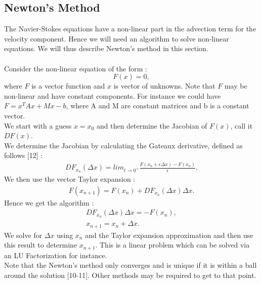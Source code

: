 \documentclass[11pt,twoside,a4paper]{article}
\begin{document}
\subsection{Newton's Method}
The Navier-Stokes equations have a non-linear part in the advection term for the velocity component. Hence we will need an algorithm to solve non-linear equations. We will thus describe Newton's method in this section.\\
\\
Consider the non-linear equation of the form :
$$
F(x) = 0 ,
$$
where $F$ is a vector function and $x$ is vector of unknowns. Note that $F$ may be non-linear and have constant components.
For instance we could have $ F = x^T A x + M x - b$, where A and M are constant matrices and b is a constant vector.\\
We start with a guess $x = x_0$ and then determine the Jacobian of $F(x)$, call it $DF(x)$.\\
We determine the Jacobian by calculating the Gateaux derivative, defined as follows [12] :
\begin{align}
DF_{x_n}(\Delta x) = lim_{t \rightarrow 0^+} \frac{F(x_n+ \epsilon \Delta x) - F(x_n)}{\epsilon}.
\end{align}
We then use the vector Taylor expansion :
\begin{align*}
F(x_{n+1}) = F(x_n) + DF_{x_n}(\Delta x) \Delta x.
\end{align*}
Hence we get the algorithm :
\begin{align}
DF_{x_n}(\Delta x) \Delta x = - F(x_n) ,\\
x_{n+1} = x_n + \Delta x.
\end{align}
We solve for $\Delta x$ using $x_n$ and the Taylor expansion approximation and then use this result to determine $x_{n+1}$.
This is a linear problem which can be solved via an LU Factorization for instance.\\
Note that the Newton's method only converges and is unique if it is within a ball around the solution [10-11]. Other methods may be required to get to that point.
\end{document}
